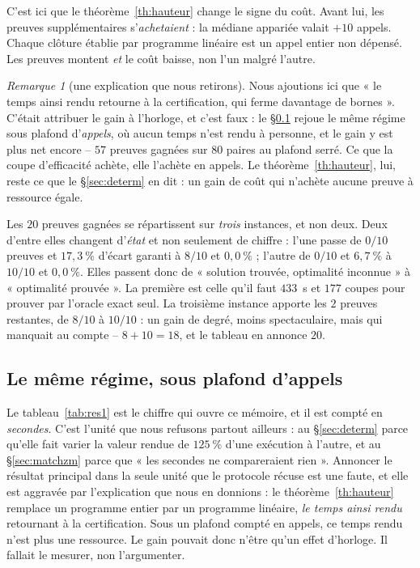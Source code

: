 \documentclass[11pt,a4paper]{article}
\theoremstyle{plain}
\theoremstyle{remark}
\newtheorem{remark}{Remarque}
\begin{document}
\noindent
C'est ici que le théorème~\ref{th:hauteur} change le signe du coût. Avant
lui, les preuves supplémentaires s'\emph{achetaient} : la médiane appariée
valait $+10$ appels. Chaque clôture établie par programme linéaire est un
appel entier non dépensé. Les preuves montent \emph{et} le coût baisse, non
l'un malgré l'autre.

\begin{remark}[une explication que nous retirons]
Nous ajoutions ici que « le temps ainsi rendu retourne à la certification,
qui ferme davantage de bornes ». C'était attribuer le gain à l'horloge, et
c'est faux : le §\ref{sec:cibledeterm} rejoue le même régime sous plafond
d'\emph{appels}, où aucun temps n'est rendu à personne, et le gain y est
plus net encore -- $57$ preuves gagnées sur $80$ paires au plafond serré.
Ce que la coupe d'efficacité achète, elle l'achète en appels. Le
théorème~\ref{th:hauteur}, lui, reste ce que le §\ref{sec:determ} en dit :
un gain de coût qui n'achète aucune preuve à ressource égale.
\end{remark}

Les $20$ preuves gagnées se répartissent sur \emph{trois} instances, et
non deux. Deux d'entre elles changent d'\emph{état} et non seulement de
chiffre : l'une passe de $0/10$ preuves et $17{,}3\ \%$ d'écart garanti à
$8/10$ et $0{,}0\ \%$ ; l'autre de $0/10$ et $6{,}7\ \%$ à $10/10$ et
$0{,}0\ \%$. Elles passent donc de « solution trouvée, optimalité inconnue »
à « optimalité prouvée ». La première est celle qu'il faut $433$~s et $177$
coupes pour prouver par l'oracle exact seul. La troisième instance apporte
les $2$ preuves restantes, de $8/10$ à $10/10$ : un gain de degré, moins
spectaculaire, mais qui manquait au compte -- $8+10=18$, et le tableau en
annonce $20$.

\subsection{Le même régime, sous plafond d'appels}
\label{sec:cibledeterm}

Le tableau~\ref{tab:res1} est le chiffre qui ouvre ce mémoire, et il est
compté en \emph{secondes}. C'est l'unité que nous refusons partout ailleurs :
au §\ref{sec:determ} parce qu'elle fait varier la valeur rendue de
$125\ \%$ d'une exécution à l'autre, et au §\ref{sec:matchzm} parce que
« les secondes ne compareraient rien ». Annoncer le résultat principal dans
la seule unité que le protocole récuse est une faute, et elle est aggravée
par l'explication que nous en donnions : le théorème~\ref{th:hauteur}
remplace un programme entier par un programme linéaire, \emph{le temps ainsi
rendu} retournant à la certification. Sous un plafond compté en appels, ce
temps rendu n'est plus une ressource. Le gain pouvait donc n'être qu'un
effet d'horloge. Il fallait le mesurer, non l'argumenter.
\end{document}

